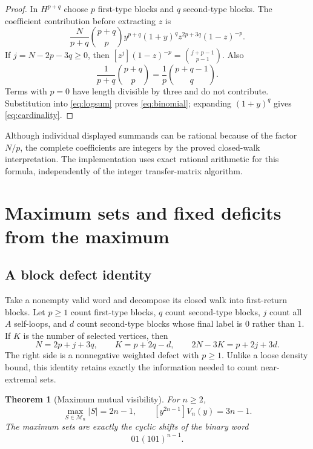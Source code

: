 \documentclass[11pt,a4paper]{article}
\newtheorem{theorem}{Theorem}[section]
\theoremstyle{definition}
\newcommand{\MV}{\mathcal M}
\begin{document}
\begin{proof}
In $H^{p+q}$ choose $p$ first-type blocks and $q$ second-type blocks.
The coefficient contribution before extracting $z$ is
\[
 \frac{N}{p+q}\binom{p+q}{p}
 y^{p+q}(1+y)^q z^{2p+3q}(1-z)^{-p}.
\]
If $j=N-2p-3q\ge0$, then
$[z^j](1-z)^{-p}=\binom{j+p-1}{p-1}$. Also
\[
 \frac{1}{p+q}\binom{p+q}{p}
 =\frac1p\binom{p+q-1}{q}.
\]
Terms with $p=0$ have length divisible by three and do not contribute.
Substitution into \cref{eq:logsum} proves \cref{eq:binomial}; expanding
$(1+y)^q$ gives \cref{eq:cardinality}.
\end{proof}

Although individual displayed summands can be rational because of the
factor $N/p$, the complete coefficients are integers by the proved
closed-walk interpretation. The implementation uses exact rational arithmetic
for this formula, independently of the integer transfer-matrix algorithm.

\section{Maximum sets and fixed deficits from the maximum}
\label{sec:extremal}

\subsection{A block defect identity}

Take a nonempty valid word and decompose its closed walk into first-return
blocks. Let $p\ge1$ count first-type blocks, $q$ count second-type blocks,
$j$ count all $A$ self-loops, and $d$ count second-type blocks whose final
label is $0$ rather than $1$. If $K$ is the number of selected vertices,
then
\begin{equation}
 N=2p+j+3q,\qquad K=p+2q-d,
 \qquad 2N-3K=p+2j+3d.
 \label{eq:defect}
\end{equation}
The right side is a nonnegative weighted defect with $p\ge1$. Unlike a
loose density bound, this identity retains exactly the information needed
to count near-extremal sets.

\begin{theorem}[Maximum mutual visibility]
\label{thm:maximum}
For $n\ge2$,
\begin{equation}
 \max_{S\in\MV_n}|S|=2n-1,
 \qquad [y^{2n-1}]V_n(y)=3n-1.
 \label{eq:maximum}
\end{equation}
The maximum sets are exactly the cyclic shifts of the binary word
\begin{equation}
 01(101)^{n-1}.
 \label{eq:maxword}
\end{equation}
\end{theorem}
\end{document}
